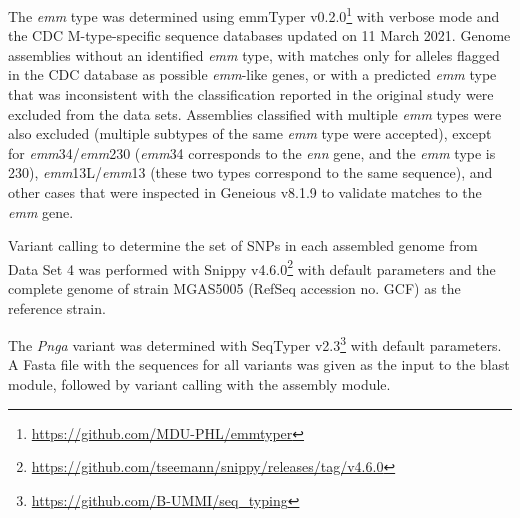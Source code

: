 The \textit{emm} type was determined using emmTyper v0.2.0\footnote{\url{https://github.com/MDU-PHL/emmtyper}} with verbose mode and the \ac{CDC} M-type-speciﬁc sequence databases updated on 11 March 2021. Genome assemblies without an identified \textit{emm} type, with matches only for alleles flagged in the \ac{CDC} database as possible \textit{emm}-like genes, or with a predicted \textit{emm} type that was inconsistent with the classification reported in the original study were excluded from the data sets. Assemblies classified with multiple \textit{emm} types were also excluded (multiple subtypes of the same \textit{emm} type were accepted), except for \textit{emm}34/\textit{emm}230 (\textit{emm}34 corresponds to the \textit{enn} gene, and the \textit{emm} type is 230), \textit{emm}13L/\textit{emm}13 (these two types correspond to the same sequence), and other cases that were inspected in Geneious v8.1.9 to validate matches to the \textit{emm} gene.

Variant calling to determine the set of \acp{SNP} in each assembled genome from Data Set 4 \cite{friaes_supplemental_2023} was performed with Snippy v4.6.0\footnote{\url{https://github.com/tseemann/snippy/releases/tag/v4.6.0}} with default parameters and the complete genome of strain MGAS5005 (RefSeq accession no. GCF) as the reference strain.

The \textit{Pnga} variant was determined with SeqTyper v2.3\footnote{\url{https://github.com/B-UMMI/seq_typing}} with default parameters. A Fasta ﬁle with the sequences for all variants was given as the input to the blast module, followed by variant calling with the assembly module.

